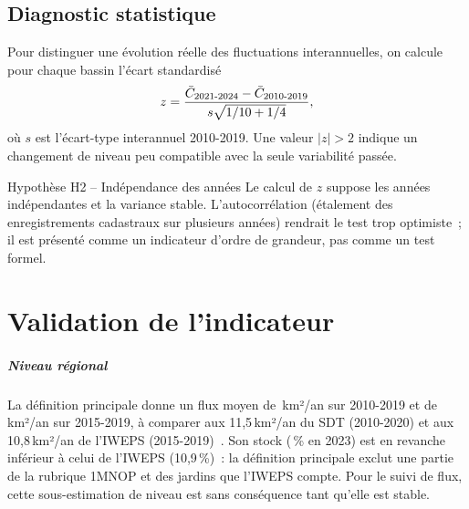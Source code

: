 \documentclass[11pt,a4paper]{report}
\newcommand{\kmdan}{\,km²/an}
\begin{document}
\section{Diagnostic statistique}
Pour distinguer une évolution réelle des fluctuations interannuelles, on calcule pour chaque bassin l'écart standardisé
\[
z = \frac{\bar C_{2021\text{-}2024} - \bar C_{2010\text{-}2019}}{s\sqrt{1/10 + 1/4}},
\]
où $s$ est l'écart-type interannuel 2010-2019. Une valeur $|z| > 2$ indique un changement de niveau peu compatible avec la seule variabilité passée.

\begin{attention}{Hypothèse H2 -- Indépendance des années}
Le calcul de $z$ suppose les années indépendantes et la variance stable. L'autocorrélation (étalement des enregistrements cadastraux sur plusieurs années) rendrait le test trop optimiste~; il est présenté comme un indicateur d'ordre de grandeur, pas comme un test formel.
\end{attention}

\chapter{Validation de l'indicateur}
\label{sec:validation}

\begin{table}[ht]
\centering\footnotesize
\caption{Validation des trois définitions cadastrales contre les références officielles. Stock~: Wallonie entière~; flux et corrélations~: hors Communauté germanophone. $r$ médian et écart absolu~: comparaison annuelle aux séries des sept bassins du SDT (2002-2021). Références~: $^{a}$ IWEPS, 2021~; $^{b}$ SDT, 2010-2020~; $^{c}$ IWEPS, \emph{Regards statistiques} n\textsuperscript{o}~12, 2015-2019.}
\label{tab:validation}

\resizebox{\textwidth}{!}{}
\end{table}

\paragraph{Niveau régional} La définition principale donne un flux moyen de \ValPrincFlux\kmdan{} sur 2010-2019 et de \ValPrincFluxQuinze\kmdan{} sur 2015-2019, à comparer aux 11,5\kmdan{} du SDT (2010-2020) et aux 10,8\kmdan{} de l'IWEPS (2015-2019)~\citep{iweps_rs12}. Son stock (\ValPrincStockVingtTrois\,\% en 2023) est en revanche inférieur à celui de l'IWEPS (10,9\,\%)~: la définition principale exclut une partie de la rubrique 1MNOP et des jardins que l'IWEPS compte. Pour le suivi de flux, cette sous-estimation de niveau est sans conséquence tant qu'elle est stable.
\end{document}
